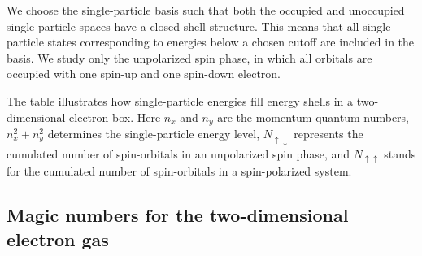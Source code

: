 \documentclass[%
oneside,                 %
final,                   %
10pt]{article}
\begin{document}
We choose  the single-particle basis such that both the occupied and 
unoccupied single-particle spaces have a closed-shell 
structure. This means that all single-particle states 
corresponding to energies below a chosen cutoff are
included in the basis. We study only the unpolarized spin
phase, in which all orbitals are occupied with one spin-up 
and one spin-down electron. 


The table illustrates  how single-particle energies
    fill energy shells in a two-dimensional electron box.
  Here $n_{x}$ and $n_{y}$ are the momentum quantum numbers,
  $n_{x}^{2} + n_{y}^{2}$ determines the single-particle 
  energy level, $N_{\uparrow \downarrow }$ represents the 
  cumulated number of spin-orbitals in an unpolarized spin
  phase, and $N_{\uparrow \uparrow }$ stands for the
  cumulated number of spin-orbitals in a spin-polarized
  system.




\subsection*{Magic numbers for the two-dimensional electron gas}
\end{document}
